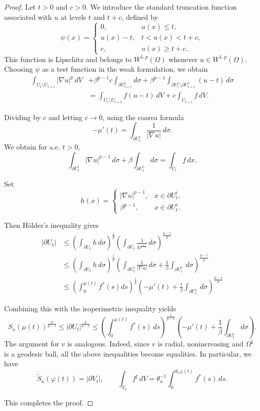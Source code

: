 \documentclass[11pt]{article}
\numberwithin{equation}{section}
\theoremstyle{definition}
\theoremstyle{remark}
\begin{document}
\begin{proof}
Let $t>0$ and $c>0$. We introduce the standard truncation function associated with $u$ at levels $t$ and $t+c$, 
defined by
\[
\psi(x)=
\begin{cases}
0, & u(x)\le t,\\[1ex]
u(x)-t, & t<u(x)<t+c,\\[1ex]
c, & u(x)\ge t+c.
\end{cases}
\]
This function is Lipschitz and belongs to $W^{1,p}(\Omega)$ whenever $u\in W^{1,p}(\Omega)$.
Choosing $\psi$ as a test function in the weak formulation, we obtain
\begin{align*}
\int_{U_t\setminus U_{t+c}} |\nabla u|^p\,dV
&+\beta^{p-1} c\int_{\partial U_{t+c}^e} d\sigma
+\beta^{p-1}\int_{\partial U_t^e\setminus \partial U_{t + c }^e}(u-t)\,d\sigma
\\
&=
\int_{U_t\setminus U_{t+c}} f(u-t)\,dV
+c\int_{U_{t+c}} f\,dV.
\end{align*}

Dividing by $c$ and letting $c\to0$, using the coarea formula 
\[
-\mu'(t)
=
\int_{\partial U_t^i}\frac{1}{|\nabla u|}\,d\sigma.
\]
We obtain for a.e. $t>0$,
\[
\int_{\partial U_t^i} |\nabla u|^{p-1}\,d\sigma
+\beta\int_{\partial U_t^e} d\sigma
=
\int_{U_t} f\,dx.
\]

Set
\[
h(x)=
\begin{cases}
|\nabla u|^{p-1}, & x\in \partial U_t^i,\\
\beta^{p-1}, & x\in \partial U_t^e.
\end{cases}
\]

Then Hölder's inequality gives
\begin{align*}
|\partial U_t|
&\le
\left(\int_{\partial U_t} h\,d\sigma\right)^\frac{1}{p}
\left(\int_{\partial U_t} \frac{1}{h^\frac{1}{p-1}}\,d\sigma\right)^\frac{p-1}{p}
\\
&\le \left(\int_{\partial U_t}h\,d\sigma\right)^\frac{1}{p}\left(\int_{\partial U_t^i}\frac{1}{|\nabla u|}\,d\sigma + \frac{1}{\beta}\int_{\partial U_t^e}\,d\sigma\right)^\frac{p-1}{p}
\\
&\le \left(\int_{0}^{\mu(t)}f^*(s)ds\right)^\frac{1}{p}\left(-\mu'(t) + \frac{1}{\beta}\int_{\partial U_t^e}\,d\sigma\right)^\frac{p-1}{p}
\end{align*}

Combining this with the isoperimetric inequality yields
\[
S_\kappa(\mu(t))^{\frac{p}{p-1}}
\le
|\partial U_t|^{\frac{p}{p-1}}
\le
\left(\int_0^{\mu(t)} f^*(s)\,ds\right)^\frac{1}{p-1}
\left(-\mu'(t)+\frac{1}{\beta}\int_{\partial U_t^e} d\sigma\right).
\]
The argument for $v$ is analogous. Indeed, since $v$ is radial, nonincreasing and $\Omega^\sharp$ is a geodesic ball, 
all the above inequalities become equalities. In particular, we have
\[
\tilde{S}_\kappa(\varphi(t)) = |\partial V_t|,
\qquad
\int_{V_t} f^\sharp\,dV
=
\theta_\kappa^{-1}
\int_0^{\theta_\kappa \varphi(t)} f^*(s)\,ds.
\]

This completes the proof.

\end{proof}
\end{document}
